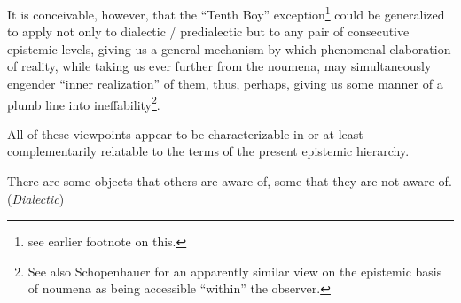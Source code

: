 \documentclass[pra,twocolumn,groupedaddress,10pt]{revtex4}
\theoremstyle{definition}
\begin{document}
\begin{enumerate}[label={[\textbf{\arabic*}]},start=0]
		It is conceivable, however, that the ``Tenth Boy'' exception\footnote{see earlier footnote on this.} could be generalized to apply not only to dialectic / predialectic but to any pair of consecutive epistemic levels, giving us a general mechanism by which phenomenal elaboration of reality, while taking us ever further from the noumena, may simultaneously engender ``inner realization'' of them, thus, perhaps, giving us some manner of a plumb line into ineffability\footnote{See also Schopenhauer\cite{schopenhauer} for an apparently similar view on the epistemic basis of noumena as being accessible ``within'' the observer.}.

		All of these viewpoints appear to be characterizable in or at least complementarily relatable to the terms of the present epistemic hierarchy.

	\item There are some objects that others are aware of, some that they are not aware of. (\emph{Dialectic})


\end{enumerate}
\end{document}
